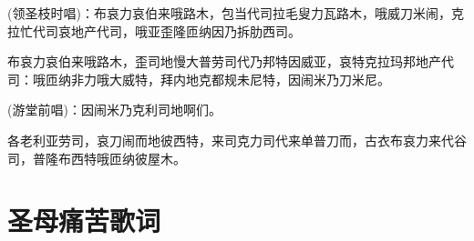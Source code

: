 \documentclass[UTF8,17pt]{ctexart}
\begin{document}
(领圣枝时唱)：布哀⼒哀伯来哦路⽊，包当代司拉⽑叟⼒⽡路⽊，哦威⼑⽶闹，克拉忙代司哀地产代司，哦亚歪隆匝纳因乃拆肋西司。

布哀⼒哀伯来哦路⽊，歪司地慢⼤普劳司代乃邦特因威亚，哀特克拉玛邦地产代司：哦匝纳⾮⼒哦⼤威特，拜内地克都规未尼特，因闹⽶乃⼑⽶尼。

(游堂前唱)：因闹⽶乃克利司地啊们。

各⽼利亚劳司，哀⼑闹⽽地彼西特，来司克⼒司代来单普⼑⽽，古⾐布哀⼒来代⾕司，普隆布西特哦匝纳彼屋⽊。

\section{圣母痛苦歌词}
















\end{document}

